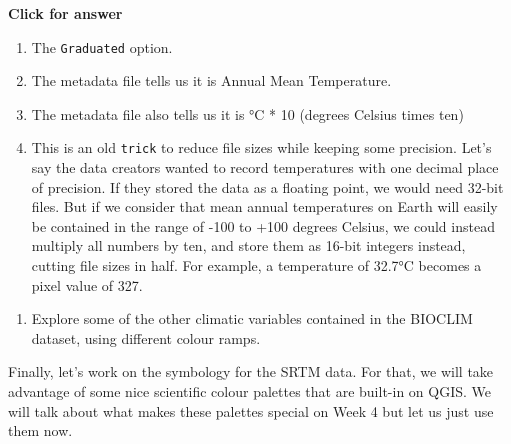 \documentclass[
  letterpaper,
  DIV=11,
  numbers=noendperiod]{scrreprt}
\providecommand{\tightlist}{%
  \setlength{\itemsep}{0pt}\setlength{\parskip}{0pt}}\usepackage{longtable,booktabs,array}
\begin{document}
\begin{tcolorbox}[enhanced jigsaw, leftrule=.75mm, colframe=quarto-callout-important-color-frame, breakable, toprule=.15mm, bottomrule=.15mm, arc=.35mm, rightrule=.15mm, opacityback=0, colback=white, left=2mm]

\vspace{-3mm}\textbf{Click for answer}\vspace{3mm}

\begin{enumerate}
\def\labelenumi{\alph{enumi})}
\item
  The \texttt{Graduated} option.
\item
  The metadata file tells us it is Annual Mean Temperature.
\item
  The metadata file also tells us it is °C * 10 (degrees Celsius times
  ten)
\item
  This is an old \texttt{trick} to reduce file sizes while keeping some
  precision. Let's say the data creators wanted to record temperatures
  with one decimal place of precision. If they stored the data as a
  floating point, we would need 32-bit files. But if we consider that
  mean annual temperatures on Earth will easily be contained in the
  range of -100 to +100 degrees Celsius, we could instead multiply all
  numbers by ten, and store them as 16-bit integers instead, cutting
  file sizes in half. For example, a temperature of 32.7°C becomes a
  pixel value of 327.
\end{enumerate}

\end{tcolorbox}

\begin{enumerate}
\def\labelenumi{(\arabic{enumi})}
\setcounter{enumi}{144}
\tightlist
\item
  Explore some of the other climatic variables contained in the BIOCLIM
  dataset, using different colour ramps.
\end{enumerate}

Finally, let's work on the symbology for the SRTM data. For that, we
will take advantage of some nice scientific colour palettes that are
built-in on QGIS. We will talk about what makes these palettes special
on Week 4 but let us just use them now.
\end{document}
